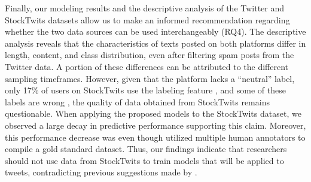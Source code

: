 Finally, our modeling results and the descriptive analysis of the Twitter and StockTwits datasets allow us to make an informed recommendation regarding whether the two data sources can be used interchangeably (RQ4). The descriptive analysis reveals that the characteristics of texts posted on both platforms differ in length, content, and class distribution, even after filtering spam posts from the Twitter data. A portion of these differences can be attributed to the different sampling timeframes. However, given that the platform lacks a ``neutral'' label, only 17\% of users on StockTwits use the labeling feature , and some of these labels are wrong , the quality of data obtained from StockTwits remains questionable. When applying the proposed models to the StockTwits dataset, we observed a large decay in predictive performance supporting this claim. Moreover, this performance decrease was even though  utilized multiple human annotators to compile a gold standard dataset. Thus, our findings indicate that researchers should not use data from StockTwits to train models that will be applied to tweets, contradicting previous suggestions made by .

